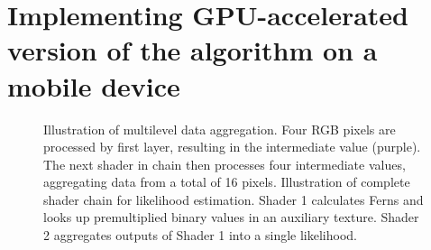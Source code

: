\documentclass[10pt,twocolumn, a4paper]{article}
\begin{document}
\section{Implementing GPU-accelerated version of the algorithm on a mobile device}
\label{implementation}
\begin{figure}[t]

    \centering


    \caption{ \protect {} Illustration of multilevel data aggregation. Four RGB pixels are processed by first layer, resulting in the intermediate value (purple). The next shader in chain then processes four intermediate values, aggregating data from a total of 16 pixels. \protect{} Illustration of complete shader chain for likelihood estimation. Shader 1 calculates Ferns and looks up premultiplied binary values in an auxiliary texture. Shader 2 aggregates outputs of Shader 1 into a single likelihood.}
\label{shaders}
\end{figure}
\end{document}
